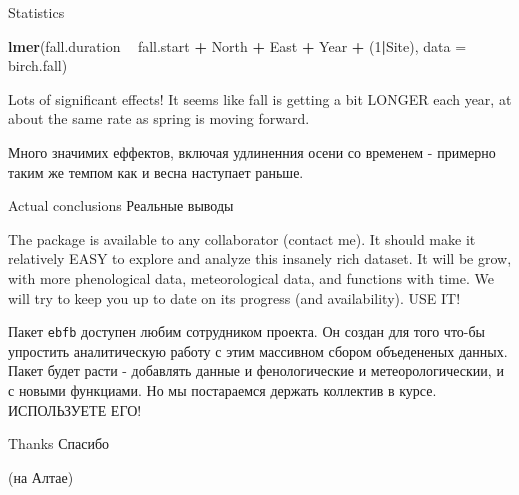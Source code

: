 \documentclass[9pt,ignorenonframetext,aspectratio=169]{beamer}
\newenvironment{Shaded}{\begin{snugshade}}{\end{snugshade}}
\newcommand{\DataTypeTok}[1]{\textcolor[rgb]{0.13,0.29,0.53}{#1}}
\newcommand{\DecValTok}[1]{\textcolor[rgb]{0.00,0.00,0.81}{#1}}
\newcommand{\KeywordTok}[1]{\textcolor[rgb]{0.13,0.29,0.53}{\textbf{#1}}}
\newcommand{\NormalTok}[1]{#1}
\newcommand{\OperatorTok}[1]{\textcolor[rgb]{0.81,0.36,0.00}{\textbf{#1}}}
\newcommand{\StringTok}[1]{\textcolor[rgb]{0.31,0.60,0.02}{#1}}
\begin{document}
\begin{frame}[fragile]{Statistics}
\protect\hypertarget{statistics}{}

\scriptsize

\begin{Shaded}
\begin{Highlighting}[]
\KeywordTok{lmer}\NormalTok{(fall.duration }\OperatorTok{~}\StringTok{ }\NormalTok{fall.start }\OperatorTok{+}\StringTok{ }\NormalTok{North }\OperatorTok{+}\StringTok{ }\NormalTok{East }\OperatorTok{+}\StringTok{ }\NormalTok{Year }\OperatorTok{+}\StringTok{ }\NormalTok{(}\DecValTok{1}\OperatorTok{|}\NormalTok{Site), }\DataTypeTok{data =}\NormalTok{ birch.fall)}
\end{Highlighting}
\end{Shaded}

\scriptsize

\normalsize 
\bi

\I Lots of significant effects! It seems like fall is getting a bit
LONGER each year, at about the same rate as spring is moving forward.

\I Много значимих еффектов, включая удлиненния осени со временем -
примерно таким же темпом как и весна наступает раньше.\\
\ei

\end{frame}

\begin{frame}[fragile]{Actual conclusions \textbar{} Реальные выводы}
\protect\hypertarget{actual-conclusions--}{}

\bcols
{}

\bi

\I The package is available to any collaborator (contact me). \I It
should make it relatively EASY to explore and analyze this insanely rich
dataset. \I It will be grow, with more phenological data, meteorological
data, and functions with time. We will try to keep you up to date on its
progress (and availability). \I USE IT! \ei 

\bi

\I Пакет \texttt{ebfb} доступен любим сотрудником проекта. \I Он создан
для того что-бы упростить аналитическую работу с этим массивном сбором
объедененых данных. \I Пакет будет расти - добавлять данные и
фенологические и метеорологическии, и с новыми функциами. Но мы
постараемся держать коллектив в курсе. \I ИСПОЛЬЗУЕТЕ ЕГО! \ei \ecols

\end{frame}

\begin{frame}{Thanks \textbar{} Спасибо}
\protect\hypertarget{thanks-}{}

\bc
{}

(на Алтае) \ec

\end{frame}
\end{document}
